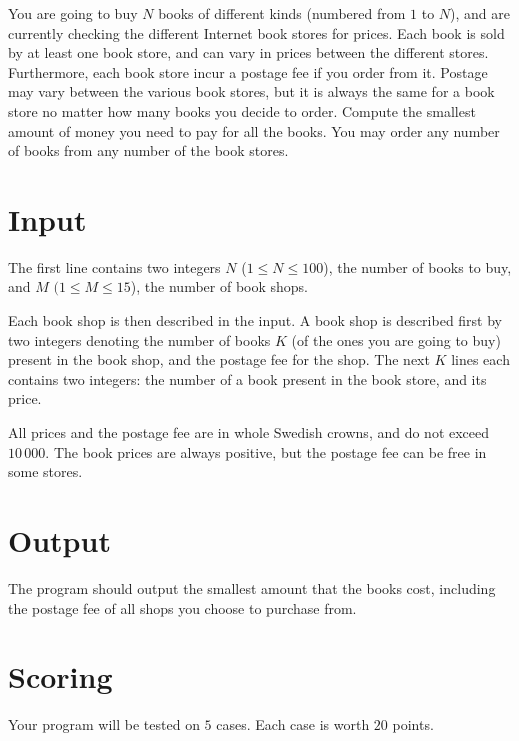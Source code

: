 You are going to buy $N$ books of different kinds (numbered from $1$ to $N$), and are currently checking the different Internet book stores for prices.
Each book is sold by at least one book store, and can vary in prices between the different stores.
Furthermore, each book store incur a postage fee if you order from it.
Postage may vary between the various book stores, but it is always the same for a book store no matter how many books you decide to order.
Compute the smallest amount of money you need to pay for all the books.
You may order any number of books from any number of the book stores.

\section*{Input}
The first line contains two integers $N$ ($1 \le N \le 100$), the number of books to buy, and $M$ $(1 \le M \le 15$), the number of book shops.

Each book shop is then described in the input.
A book shop is described first by two integers denoting the number of books $K$ (of the ones you are going to buy) present in the book shop, and the postage fee for the shop.
The next $K$ lines each contains two integers: the number of a book present in the book store, and its price.

All prices and the postage fee are in whole Swedish crowns, and do not exceed $10\,000$.
The book prices are always positive, but the postage fee can be free in some stores.

\section*{Output}
The program should output the smallest amount that the books cost, including the postage fee of all shops you choose to purchase from.

\section*{Scoring}
Your program will be tested on $5$ cases.
Each case is worth $20$ points.

